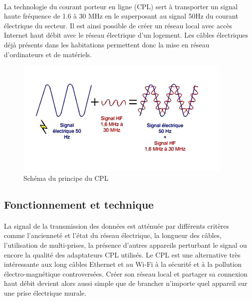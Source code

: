             \paragraph{}
La technologie du courant porteur en ligne (CPL) sert à transporter un signal haute fréquence de 1.6 à 30 MHz en le superposant au signal 50Hz du courant électrique du secteur.
Il est ainsi possible de créer un réseau local avec accès Internet haut débit avec le réseau électrique d'un logement.
Les câbles électriques déjà présents dans les habitations permettent donc la mise en réseau d'ordinateurs et de matériels.
    \begin{figure}[h]
        \begin{center}
            \includegraphics[scale=0.7]{./images/cpl/principeCpl.jpg}
        \end{center}
            \caption{ Schéma du principe du CPL } %
            \label{Principe du CPL}
    \end{figure}

        \subsection{Fonctionnement et technique}
            \paragraph{}
La signal de la transmission des données est atténuée par différents critères comme l’ancienneté et l'état du réseau électrique, la longueur des câbles, l'utilisation de multi-prises, la présence d'autres appareils perturbant le signal ou encore la qualité des adaptateurs CPL utilisés.
Le CPL est une alternative très intéressante aux long câbles Ethernet et au Wi-Fi à la sécurité et à la pollution électro-magnétique controversées.
Créer son réseau local et partager sa connexion haut débit devient alors aussi simple que de brancher n'importe quel appareil sur une prise électrique murale.

